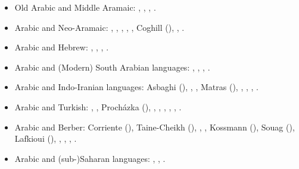 \documentclass[output=paper]{langsci/langscibook}
\begin{document}
\newpage
\begin{itemize}[noitemsep,leftmargin=11pt]
\item[\adfhalfrightarrowhead]Old Arabic and Middle Aramaic: \citet{Fraenkel1886}, \citet{Stein2018}, \citet{Retsö2011}, \citet{Weninger2011Aramaic}.

\item[\adfhalfrightarrowhead]Arabic and Neo-Aramaic: \citet{Sabar1984},
\citet{ArnoldBehnstedt1993}, \citet{Khan2002}, \citet{Arnold2007}, \citet{Borg2008}, Coghill (\citeyear{Coghill2010,Coghill2012,Coghill2015}), \citet{Jastrow2015}, \citet{Owens2016Aramaic}.

\item[\adfhalfrightarrowhead]Arabic and Hebrew:
\citet{Blau1981}, \citet{Nevo1999}, \citet{Yoda2013}, \citet{Horesh2015}.

\item[\adfhalfrightarrowhead]Arabic and (Modern) South Arabian languages: \citet{Diem1979}, \citet{Lonnet2011}, \citet{Zammit2011}, \citet{Watson2018}.

\item[\adfhalfrightarrowhead]Arabic and Indo-Iranian languages: Asbaghi (\citeyear{Asbaghi1987,Asbaghi2011}), \citet{Tsabolov1994}, \citet{Ingham2005}, Matras (\citeyear{Matras2007Domari,Matras2012}), \citet{Gazsi2011}, \citet{Ṣādiqī2011}, \citet{WalAnonby2015}, \citet{Herin2018}.

\item[\adfhalfrightarrowhead]Arabic and Turkish: \citet{BenCheneb1922}, \citet{Reinkowski1995}, Procházka (\citeyear{Procházka2002Adana,Procházka2011Turkish}), \citet{Isaksson2005}, \citet{SánchezVicente2012}, \citet{Haig2014}, \citet{Taylan2017}, \citet{AkkusBenmamoun2018}, \citet{Procházka-Eisl2018}.

\item[\adfhalfrightarrowhead]Arabic and Berber: Corriente (\citeyear{Corriente1998Berber,Corriente2002}), Taine-Cheikh (\citeyear{Taine-Cheikh1997Zenaga,Taine-Cheikh2008chapter,Taine-Cheikh2012,Taine-Cheikh2018quadri}), \citet{Brahimi2000}, \citet{Ameur2008}, Kossmann
(\citeyear{Kossmann2009,Kossmann2010,Kossmann2013book,Kossmann2013chapter,Kossmann2014}), Souag (\citeyear{Souag2007,Souag2009,Souag2013book,Souag2018berber,Souag2018thing}), Lafkioui (\citeyear{Lafkioui2013reinventing,Lafkioui2013bu}), \citet{Tigziri2008}, \citet{ElAissati2011}, \citet{vanPuttenSouag2015}, \citet{vanPuttenBenkato2017}.

\item[\adfhalfrightarrowhead]Arabic and (sub-)Saharan languages: \citet{Owens2000article,Owens2015,Owens2016idioms}, \citet{OwensHassan2004}, \citet{Souag2013lexical,Souag2016sahara}.


\end{itemize}
\end{document}
